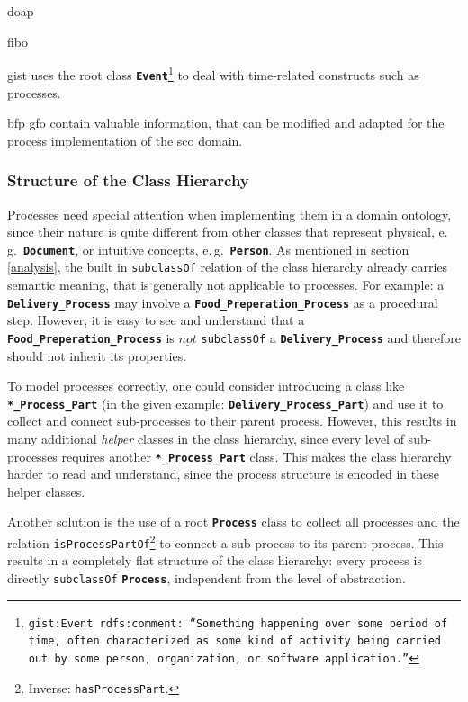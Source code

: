 \documentclass[a4paper, DIV=13, BCOR=0cm]{scrbook}
\newcommand{\eg}{e.\,g.\ }
\newcommand{\class}[1]{\texttt{\textbf{#1}}}
\newcommand{\relation}[1]{\texttt{#1}}
\newcommand{\foottt}[1]{\footnote{\texttt{#1}}}
\begin{document}
\gls{doap}

\gls{fibo}

\gls{gist} uses the root class \class{Event}\foottt{gist:Event rdfs:comment: \enquote{Something happening over some period of time, often characterized as some kind of activity being carried out by some person, organization, or software application.}} to deal with time-related constructs such as processes.

bfp gfo contain valuable information, that can be modified and adapted for the process implementation of the \gls{sco} domain.


\subsubsection{Structure of the Class Hierarchy }
Processes need special attention when implementing them in a domain ontology, since their nature is quite different from other classes that represent physical, \eg \class{Document}, or intuitive concepts, \eg \class{Person}. As mentioned in section \ref{analysis}, the built in \relation{subclassOf} relation of the class hierarchy already carries semantic meaning, that is generally not applicable to processes. For example: a \class{Delivery\_Process} may involve a \class{Food\_Preperation\_Process} as a procedural step. However, it is easy to see and understand that a \class{Food\_Preperation\_Process} is $\underline{not}$ \relation{subclassOf} a \class{Delivery\_Process} and therefore should not inherit its properties.

To model processes correctly, one could consider introducing a class like \class{*\_Process\_Part} (in the given example: \class{Delivery\_Process\_Part}) and use it to collect and connect sub-processes to their parent process. However, this results in many additional \textit{helper} classes in the class hierarchy, since every level of sub-processes requires another \class{*\_Process\_Part} class. This makes the class hierarchy harder to read and understand, since the process structure is encoded in these helper classes.

Another solution is the use of a root \class{Process} class to collect all processes and the relation \relation{isProcessPartOf}\footnote{Inverse: \relation{hasProcessPart}.} to connect a sub-process to its parent process. This results in a completely flat structure of the class hierarchy: every process is directly \relation{subclassOf} \class{Process}, independent from the level of abstraction. 
\end{document}

